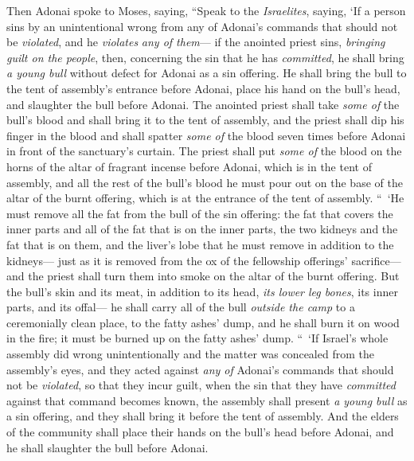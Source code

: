 \begin{biblechapter} %
 Then Adonai spoke to Moses, saying,
\verse “Speak to the \textit{Israelites}, saying, ‘If a person sins by an unintentional wrong from any of Adonai’s commands that should not be \textit{violated}, and he \textit{violates} \textit{any of them}—
\verse if the anointed priest sins, \textit{bringing guilt on the people}, then, concerning the sin that he has \textit{committed}, he shall bring \textit{a young bull} without defect for Adonai as a sin offering.
\verse He shall bring the bull to the tent of assembly’s entrance before Adonai, place his hand on the bull’s head, and slaughter the bull before Adonai.
\verse The anointed priest shall take \textit{some of} the bull’s blood and shall bring it to the tent of assembly,
\verse and the priest shall dip his finger in the blood and shall spatter \textit{some of} the blood seven times before Adonai in front of the sanctuary’s curtain.
\verse The priest shall put \textit{some of} the blood on the horns of the altar of fragrant incense before Adonai, which is in the tent of assembly, and all the rest of the bull’s blood he must pour out on the base of the altar of the burnt offering, which is at the entrance of the tent of assembly.
\verse “ ‘He must remove all the fat from the bull of the sin offering: the fat that covers the inner parts and all of the fat that is on the inner parts,
\verse the two kidneys and the fat that is on them, and the liver’s lobe that he must remove in addition to the kidneys—
\verse just as it is removed from the ox of the fellowship offerings’ sacrifice—and the priest shall turn them into smoke on the altar of the burnt offering.
\verse But the bull’s skin and its meat, in addition to its head, \textit{its lower leg bones}, its inner parts, and its offal—
\verse he shall carry all of the bull \textit{outside the camp} to a ceremonially clean place, to the fatty ashes’ dump, and he shall burn it on wood in the fire; it must be burned up on the fatty ashes’ dump.
\verse “ ‘If Israel’s whole assembly did wrong unintentionally and the matter was concealed from the assembly’s eyes, and they acted against \textit{any of} Adonai’s commands that should not be \textit{violated}, so that they incur guilt,
\verse when the sin that they have \textit{committed} against that command becomes known, the assembly shall present \textit{a young bull} as a sin offering, and they shall bring it before the tent of assembly.
\verse And the elders of the community shall place their hands on the bull’s head before Adonai, and he shall slaughter the bull before Adonai.

\end{biblechapter}

